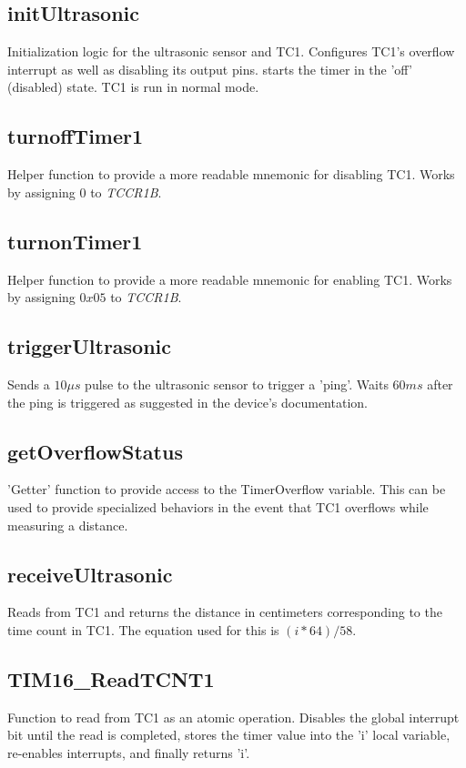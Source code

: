 \documentclass[letterpaper,11pt]{texMemo} %
\begin{document}
\subsection*{initUltrasonic}
Initialization logic for the ultrasonic sensor and TC1. Configures TC1's overflow interrupt as well as disabling its output pins. starts the timer in the 'off' (disabled) state. TC1 is run in normal mode.

\subsection*{turnoffTimer1}
Helper function to provide a more readable mnemonic for disabling TC1. Works by assigning $0$ to \textit{TCCR1B}.

\subsection*{turnonTimer1}
Helper function to provide a more readable mnemonic for enabling TC1. Works by assigning $0x05$ to \textit{TCCR1B}.

\subsection*{triggerUltrasonic}
Sends a $10\mu{s}$ pulse to the ultrasonic sensor to trigger a 'ping'. Waits $60ms$ after the ping is triggered as suggested in the device's documentation.

\subsection*{getOverflowStatus}
'Getter' function to provide access to the TimerOverflow variable. This can be used to provide specialized behaviors in the event that TC1 overflows while measuring a distance.

\subsection*{receiveUltrasonic}
Reads from TC1 and returns the distance in centimeters corresponding to the time count in TC1. The equation used for this is $(i * 64) / 58$.

\subsection*{TIM16\_ReadTCNT1}
Function to read from TC1 as an atomic operation. Disables the global interrupt bit until the read is completed, stores the timer value into the 'i' local variable, re-enables interrupts, and finally returns 'i'.
\end{document}

